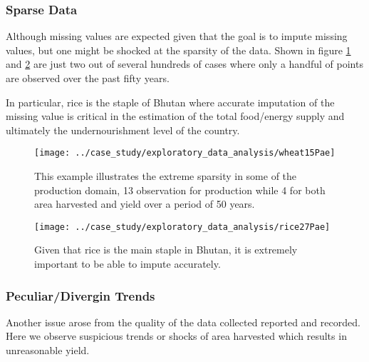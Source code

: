 \documentclass[nojss]{jss}\usepackage[]{graphicx}\usepackage[]{color}
\begin{document}
\subsubsection{Sparse Data}
Although missing values are expected given that the goal is to impute
missing values, but one might be shocked at the sparsity of the
data. Shown in figure \ref{fig:wheatBotswana} and \ref{fig:riceBhutan}
are just two out of several hundreds of cases where only a handful of
points are observed over the past fifty years. 


In particular, rice is the staple of Bhutan where accurate imputation
of the missing value is critical in the estimation of the total
food/energy supply and ultimately the undernourishment level of the
country.

\begin{figure}[!ht]
  \centering
  \texttt{[image: ../case\_study/exploratory\_data\_analysis/wheat15Pae]}
 \caption{This example illustrates the extreme sparsity in some of the
   production domain, 13 observation for production while 4 for both
   area harvested and yield over a period of 50 years.}
  \label{fig:wheatBotswana} 
\end{figure}

\begin{figure}[!ht]
  \centering
  \texttt{[image: ../case\_study/exploratory\_data\_analysis/rice27Pae]}
  \caption{Given that rice is the main staple in Bhutan, it is
    extremely important to be able to impute accurately.}
  \label{fig:riceBhutan}  
\end{figure}

\FloatBarrier
\subsubsection{Peculiar/Divergin Trends}


Another issue arose from the quality of the data collected reported
and recorded. Here we observe suspicious trends or shocks of area
harvested which results in unreasonable yield.
\end{document}
